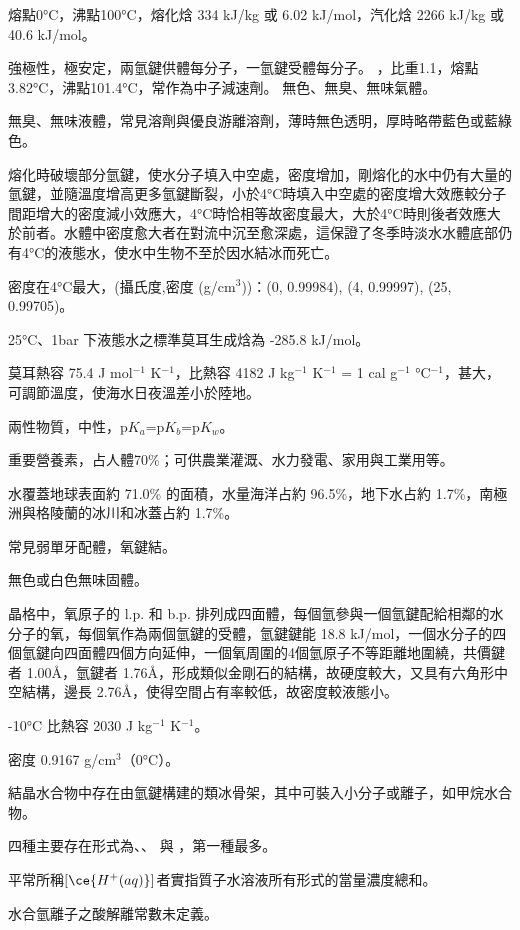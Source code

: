 \documentclass[a4paper,12pt]{report}
\begin{document}
\eit
{}
\bit
\item 熔點0°C，沸點100°C，熔化焓 334 kJ/kg 或 6.02 kJ/mol，汽化焓 2266 kJ/kg 或 40.6 kJ/mol。
\item 強極性，極安定，兩氫鍵供體每分子，一氫鍵受體每分子。
\eit
{}
，比重1.1，熔點3.82°C，沸點101.4°C，常作為中子減速劑。
無色、無臭、無味氣體。
\bit
\item 無臭、無味液體，常見溶劑與優良游離溶劑，薄時無色透明，厚時略帶藍色或藍綠色。
\item 熔化時破壞部分氫鍵，使水分子填入中空處，密度增加，剛熔化的水中仍有大量的氫鍵，並隨溫度增高更多氫鍵斷裂，小於4°C時填入中空處的密度增大效應較分子間距增大的密度減小效應大，4°C時恰相等故密度最大，大於4°C時則後者效應大於前者。水體中密度愈大者在對流中沉至愈深處，這保證了冬季時淡水水體底部仍有4°C的液態水，使水中生物不至於因水結冰而死亡。
\item 密度在4°C最大，(攝氏度,密度 (g/cm$^3$))：(0, 0.99984), (4, 0.99997), (25, 0.99705)。
\item 25°C、1bar 下液態水之標準莫耳生成焓為 -285.8 kJ/mol。
\item 莫耳熱容 75.4 J mol$^{-1}$ K$^{-1}$，比熱容 4182 J kg$^{-1}$ K$^{-1}$ = 1 cal g$^{-1}$ °C$^{-1}$，甚大，可調節溫度，使海水日夜溫差小於陸地。
\item 兩性物質，中性，p$K_a$=p$K_b$=p$K_w$。
\item 重要營養素，占人體70\%；可供農業灌溉、水力發電、家用與工業用等。
\item 水覆蓋地球表面約 71.0\% 的面積，水量海洋占約 96.5\%，地下水占約 1.7\%，南極洲與格陵蘭的冰川和冰蓋占約 1.7\%。
\item 常見弱單牙配體，氧鍵結。
\eit
{}
\bit
\item 無色或白色無味固體。
\item 晶格中，氧原子的 l.p. 和 b.p. 排列成四面體，每個氫參與一個氫鍵配給相鄰的水分子的氧，每個氧作為兩個氫鍵的受體，氫鍵鍵能 18.8 kJ/mol，一個水分子的四個氫鍵向四面體四個方向延伸，一個氧周圍的4個氫原子不等距離地圍繞，共價鍵者 1.00\AA，氫鍵者 1.76\AA，形成類似金剛石的結構，故硬度較大，又具有六角形中空結構，邊長  2.76\AA，使得空間占有率較低，故密度較液態小。
\item -10°C 比熱容 2030 J kg$^{-1}$ K$^{-1}$。
\item 密度 0.9167 g/cm$^3$（0°C）。
\item 結晶水合物中存在由氫鍵構建的類冰骨架，其中可裝入小分子或離子，如甲烷水合物。
\eit
{}
\bit
\item 四種主要存在形式為、、 與 ，第一種最多。
\item 平常所稱$[\ce{H^+(aq)}]$者實指質子水溶液所有形式的當量濃度總和。
\item 水合氫離子之酸解離常數未定義。
\eit
{}
\end{document}
